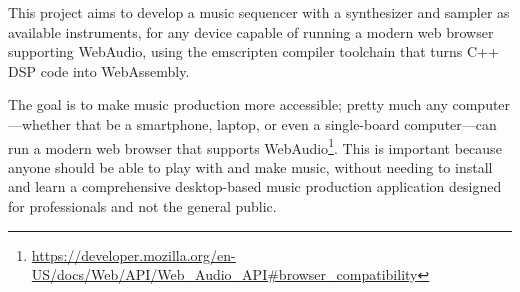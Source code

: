 \noindent
This project aims to develop a music sequencer with a synthesizer and sampler as available instruments, 
for any device capable of 
running a modern web browser supporting WebAudio, using the emscripten compiler toolchain that 
turns C++ DSP code into WebAssembly. 

The goal is to make music production more accessible; pretty much any computer---whether that 
be a smartphone, laptop, or even a single-board computer---can run a modern web browser that supports 
WebAudio\footnote{\url{https://developer.mozilla.org/en-US/docs/Web/API/Web_Audio_API\#browser_compatibility}\label{fn:web_audio}}. This is important because anyone should be able to play with and make music, without needing to 
install and learn a comprehensive desktop-based music production application designed 
for professionals and not the general public.

